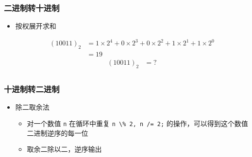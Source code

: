 \begin{frame}[fragile]
    \frametitle{二进制转十进制}

     {
        \begin{itemize}
            \item 按权展开求和
    
             {
                \begin{align*}
                    (10011)_{2} &= 1 \times 2^4 + 0 \times 2^3 + 0 \times 2^2 + 1 \times 2^1 + 1 \times 2^0\\
                                &= 19
                \end{align*}
            } {
                \begin{align*}
                    (10011)_{2} &= ?\\
                \end{align*}
            }
    
        \end{itemize}
    }
    
     {
        
    }

\end{frame}

\begin{frame}[fragile]
    \frametitle{十进制转二进制}

     {
        \begin{itemize}
            \item 除二取余法
            \begin{itemize}
               \item 对一个数值 \lstinline|n| 在循环中重复 \lstinline|n \% 2, n /= 2;| 的操作，可以得到这个数值二进制逆序的每一位
               \item 取余二除以二，逆序输出
            \end{itemize}
        \end{itemize}    
    }
    
     {
        
            
    }

\end{frame}


